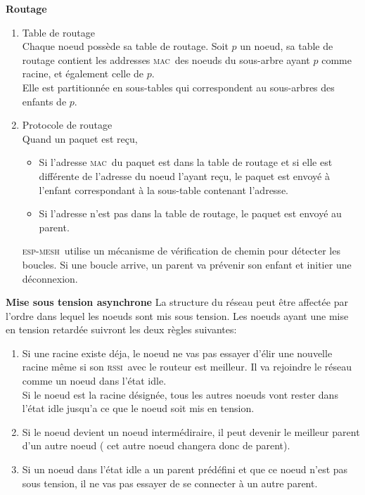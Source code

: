 \documentclass[a4paper, 12pt]{report}
\newcommand{\espmesh}{\textsc{esp-mesh}}
\newcommand{\mac}{\textsc{mac}}
\newcommand{\rssi}{\textsc{rssi}}
\begin{document}
        \textbf{Routage}\newline
            \begin{enumerate}
                \item Table de routage\\
                    Chaque noeud possède sa table de routage. Soit $p$ un noeud, sa table de routage contient les addresses \mac\ 
                    des noeuds du sous-arbre ayant $p$ comme racine, et également celle de $p$.\\
                    Elle est partitionnée en sous-tables qui correspondent au sous-arbres des enfants de $p$.
                \item Protocole de routage\\
                    Quand un paquet est reçu,
                    \begin{itemize}
                        \item Si l'adresse \mac\ du paquet est dans la table de routage et si elle est différente de l'adresse du noeud l'ayant reçu, le paquet est envoyé
                        à l'enfant correspondant à la sous-table contenant l'adresse.
                        \item Si l'adresse n'est pas dans la table de routage, le paquet est envoyé au parent.
                    \end{itemize}
                    \espmesh\ utilise un mécanisme de vérification de chemin pour détecter les boucles. Si une boucle arrive, un parent va prévenir son enfant et initier une déconnexion.

            \end{enumerate}
            \vspace{0.5cm}
        \textbf{Mise sous tension asynchrone}\newline
            La structure du réseau peut être affectée par l'ordre dans lequel les noeuds sont mis sous tension.
            Les noeuds ayant une mise en tension retardée suivront les deux règles suivantes:
            \begin{enumerate}
                \item Si une racine existe déja, le noeud ne vas pas essayer d'élir une nouvelle racine
                    même si son \rssi\ avec le routeur est meilleur. Il va rejoindre le réseau comme un noeud
                    dans l'état idle. \\
                    Si le noeud est la racine désignée, tous les autres noeuds vont rester dans l'état idle
                    jusqu'a ce que le noeud soit mis en tension.
                \item Si le noeud devient un noeud intermédiraire, il peut devenir le meilleur parent d'un autre noeud ( cet autre noeud changera donc de parent).
                \item Si un noeud dans l'état idle a un parent prédéfini et que ce noeud n'est pas sous tension, il ne vas pas essayer de se connecter à un autre parent.
            \end{enumerate}
\end{document}
